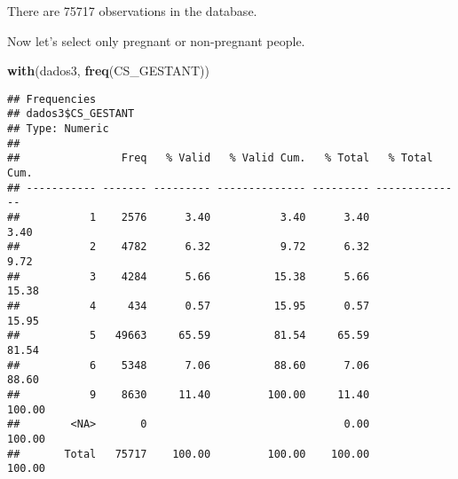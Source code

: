 \documentclass[
]{article}
\newenvironment{Shaded}{\begin{snugshade}}{\end{snugshade}}
\newcommand{\KeywordTok}[1]{\textcolor[rgb]{0.13,0.29,0.53}{\textbf{#1}}}
\newcommand{\NormalTok}[1]{#1}
\begin{document}
There are 75717 observations in the database.

Now let's select only pregnant or non-pregnant people.

\begin{Shaded}
\begin{Highlighting}[]
\KeywordTok{with}\NormalTok{(dados3, }\KeywordTok{freq}\NormalTok{(CS_GESTANT))}
\end{Highlighting}
\end{Shaded}

\begin{verbatim}
## Frequencies  
## dados3$CS_GESTANT  
## Type: Numeric  
## 
##                Freq   % Valid   % Valid Cum.   % Total   % Total Cum.
## ----------- ------- --------- -------------- --------- --------------
##           1    2576      3.40           3.40      3.40           3.40
##           2    4782      6.32           9.72      6.32           9.72
##           3    4284      5.66          15.38      5.66          15.38
##           4     434      0.57          15.95      0.57          15.95
##           5   49663     65.59          81.54     65.59          81.54
##           6    5348      7.06          88.60      7.06          88.60
##           9    8630     11.40         100.00     11.40         100.00
##        <NA>       0                               0.00         100.00
##       Total   75717    100.00         100.00    100.00         100.00
\end{verbatim}
\end{document}
